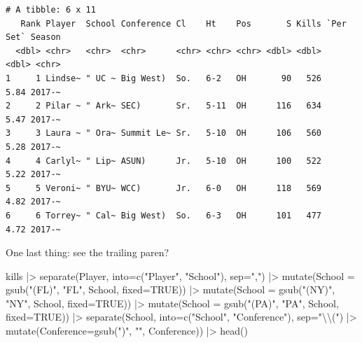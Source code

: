 \documentclass[
  letterpaper,
  DIV=11,
  numbers=noendperiod]{scrreprt}
\newenvironment{Shaded}{\begin{snugshade}}{\end{snugshade}}
\newcommand{\AttributeTok}[1]{\textcolor[rgb]{0.40,0.45,0.13}{#1}}
\newcommand{\ConstantTok}[1]{\textcolor[rgb]{0.56,0.35,0.01}{#1}}
\newcommand{\FunctionTok}[1]{\textcolor[rgb]{0.28,0.35,0.67}{#1}}
\newcommand{\NormalTok}[1]{\textcolor[rgb]{0.00,0.23,0.31}{#1}}
\newcommand{\SpecialCharTok}[1]{\textcolor[rgb]{0.37,0.37,0.37}{#1}}
\newcommand{\StringTok}[1]{\textcolor[rgb]{0.13,0.47,0.30}{#1}}
\begin{document}
\begin{verbatim}
# A tibble: 6 x 11
   Rank Player  School Conference Cl    Ht    Pos       S Kills `Per Set` Season
  <dbl> <chr>   <chr>  <chr>      <chr> <chr> <chr> <dbl> <dbl>     <dbl> <chr> 
1     1 Lindse~ " UC ~ Big West)  So.   6-2   OH       90   526      5.84 2017-~
2     2 Pilar ~ " Ark~ SEC)       Sr.   5-11  OH      116   634      5.47 2017-~
3     3 Laura ~ " Ora~ Summit Le~ Sr.   5-10  OH      106   560      5.28 2017-~
4     4 Carlyl~ " Lip~ ASUN)      Jr.   5-10  OH      100   522      5.22 2017-~
5     5 Veroni~ " BYU~ WCC)       Jr.   6-0   OH      118   569      4.82 2017-~
6     6 Torrey~ " Cal~ Big West)  So.   6-3   OH      101   477      4.72 2017-~
\end{verbatim}

One last thing: see the trailing paren?

\begin{Shaded}
\begin{Highlighting}[]
\NormalTok{kills }\SpecialCharTok{|\textgreater{}} 
  \FunctionTok{separate}\NormalTok{(Player, }\AttributeTok{into=}\FunctionTok{c}\NormalTok{(}\StringTok{"Player"}\NormalTok{, }\StringTok{"School"}\NormalTok{), }\AttributeTok{sep=}\StringTok{","}\NormalTok{) }\SpecialCharTok{|\textgreater{}} 
  \FunctionTok{mutate}\NormalTok{(}\AttributeTok{School =} \FunctionTok{gsub}\NormalTok{(}\StringTok{"(FL)"}\NormalTok{, }\StringTok{"FL"}\NormalTok{, School, }\AttributeTok{fixed=}\ConstantTok{TRUE}\NormalTok{)) }\SpecialCharTok{|\textgreater{}}
  \FunctionTok{mutate}\NormalTok{(}\AttributeTok{School =} \FunctionTok{gsub}\NormalTok{(}\StringTok{"(NY)"}\NormalTok{, }\StringTok{"NY"}\NormalTok{, School, }\AttributeTok{fixed=}\ConstantTok{TRUE}\NormalTok{)) }\SpecialCharTok{|\textgreater{}}
  \FunctionTok{mutate}\NormalTok{(}\AttributeTok{School =} \FunctionTok{gsub}\NormalTok{(}\StringTok{"(PA)"}\NormalTok{, }\StringTok{"PA"}\NormalTok{, School, }\AttributeTok{fixed=}\ConstantTok{TRUE}\NormalTok{)) }\SpecialCharTok{|\textgreater{}}
  \FunctionTok{separate}\NormalTok{(School, }\AttributeTok{into=}\FunctionTok{c}\NormalTok{(}\StringTok{"School"}\NormalTok{, }\StringTok{"Conference"}\NormalTok{), }\AttributeTok{sep=}\StringTok{"}\SpecialCharTok{\textbackslash{}\textbackslash{}}\StringTok{("}\NormalTok{) }\SpecialCharTok{|\textgreater{}} 
  \FunctionTok{mutate}\NormalTok{(}\AttributeTok{Conference=}\FunctionTok{gsub}\NormalTok{(}\StringTok{")"}\NormalTok{, }\StringTok{""}\NormalTok{, Conference)) }\SpecialCharTok{|\textgreater{}}
  \FunctionTok{head}\NormalTok{()}
\end{Highlighting}
\end{Shaded}
\end{document}
